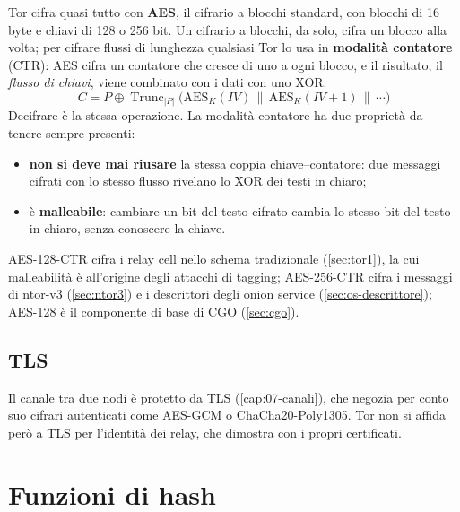 Tor cifra quasi tutto con \textbf{AES}, il cifrario a blocchi standard, con blocchi di 16 byte e chiavi di 128 o 256 bit. Un cifrario a blocchi, da solo, cifra un blocco alla volta; per cifrare flussi di lunghezza qualsiasi Tor lo usa in \textbf{modalità contatore} (CTR): AES cifra un contatore che cresce di uno a ogni blocco, e il risultato, il \emph{flusso di chiavi}, viene combinato con i dati con uno XOR:
\[ C = P \oplus \operatorname{Trunc}_{|P|}\bigl(\mathrm{AES}_K(\mathit{IV}) \,\|\, \mathrm{AES}_K(\mathit{IV}+1) \,\|\, \cdots\bigr) \]
Decifrare è la stessa operazione. La modalità contatore ha due proprietà da tenere sempre presenti:
\begin{itemize}
  \item \textbf{non si deve mai riusare} la stessa coppia chiave--contatore: due messaggi cifrati con lo stesso flusso rivelano lo XOR dei testi in chiaro;
  \item è \textbf{malleabile}: cambiare un bit del testo cifrato cambia lo stesso bit del testo in chiaro, senza conoscere la chiave.
\end{itemize}
AES-128-CTR cifra i relay cell nello schema tradizionale (\cref{sec:tor1}), la cui malleabilità è all'origine degli attacchi di tagging; AES-256-CTR cifra i messaggi di ntor-v3 (\cref{sec:ntor3}) e i descrittori degli onion service (\cref{sec:os-descrittore}); AES-128 è il componente di base di CGO (\cref{sec:cgo}).

\subsection{TLS}

Il canale tra due nodi è protetto da TLS (\cref{cap:07-canali}), che negozia per conto suo cifrari autenticati come AES-GCM o ChaCha20-Poly1305. Tor non si affida però a TLS per l'identità dei relay, che dimostra con i propri certificati.

\section{Funzioni di hash}\label{sec:cripto-hash}

